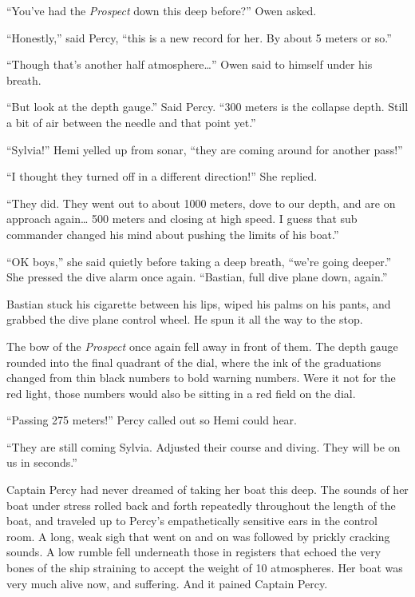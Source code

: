 \documentclass[
]{scrbook}
\begin{document}
``You've had the \emph{Prospect} down this deep before?'' Owen asked.

``Honestly,'' said Percy, ``this is a new record for her. By about 5
meters or so.''

``Though that's another half atmosphere\ldots{}'' Owen said to himself
under his breath.

``But look at the depth gauge.'' Said Percy. ``300 meters is the
collapse depth. Still a bit of air between the needle and that point
yet.''

``Sylvia!'' Hemi yelled up from sonar, ``they are coming around for
another pass!''

``I thought they turned off in a different direction!'' She replied.

``They did. They went out to about 1000 meters, dove to our depth, and
are on approach again\ldots{} 500 meters and closing at high speed. I
guess that sub commander changed his mind about pushing the limits of
his boat.''

``OK boys,'' she said quietly before taking a deep breath, ``we're going
deeper.'' She pressed the dive alarm once again. ``Bastian, full dive
plane down, again.''

Bastian stuck his cigarette between his lips, wiped his palms on his
pants, and grabbed the dive plane control wheel. He spun it all the way
to the stop.

The bow of the \emph{Prospect} once again fell away in front of them.
The depth gauge rounded into the final quadrant of the dial, where the
ink of the graduations changed from thin black numbers to bold warning
numbers. Were it not for the red light, those numbers would also be
sitting in a red field on the dial.

``Passing 275 meters!'' Percy called out so Hemi could hear.

``They are still coming Sylvia. Adjusted their course and diving. They
will be on us in seconds.''

Captain Percy had never dreamed of taking her boat this deep. The sounds
of her boat under stress rolled back and forth repeatedly throughout the
length of the boat, and traveled up to Percy's empathetically sensitive
ears in the control room. A long, weak sigh that went on and on was
followed by prickly cracking sounds. A low rumble fell underneath those
in registers that echoed the very bones of the ship straining to accept
the weight of 10 atmospheres. Her boat was very much alive now, and
suffering. And it pained Captain Percy.
\end{document}
